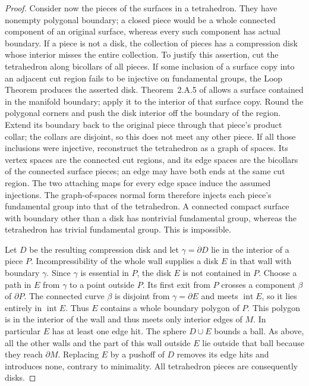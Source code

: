 \documentclass[11pt]{article}
\numberwithin{equation}{section}
\theoremstyle{definition}
\theoremstyle{remark}
\begin{document}
\begin{proof}
Consider now the pieces of the surfaces in a tetrahedron.  They have nonempty
polygonal boundary; a closed piece would be a whole connected component of
an original surface, whereas every such component has actual boundary.
If a piece is not a disk, the collection of pieces has a compression disk
whose interior misses the entire collection.  To justify this assertion, cut
the tetrahedron along bicollars of all pieces.  If some inclusion of a surface
copy into an adjacent cut region fails to be injective on fundamental groups,
the Loop Theorem produces the asserted disk.  Theorem~2.A.5 of \cite[p.~13]{Stallings1971} allows a surface
contained in the manifold boundary; apply it to the interior of that
surface copy.  Round the polygonal corners and push the
disk interior off the boundary of the region.  Extend its boundary back
to the original piece through that piece's product collar; the collars
are disjoint, so this does not meet any other piece.
If all those inclusions were
injective, reconstruct the tetrahedron as a graph of spaces.  Its vertex
spaces are the connected cut regions, and its edge spaces are the
bicollars of the connected surface pieces; an edge may have both ends
at the same cut region.  The two attaching maps for every edge space
induce the assumed injections.  The graph-of-spaces normal form
therefore injects each piece's fundamental group into that of the
tetrahedron.  A connected compact surface
with boundary other than a disk has nontrivial fundamental group, whereas the
tetrahedron has trivial fundamental group.  This is impossible.

Let $D$ be the resulting compression disk and let $\gamma=\partial D$ lie in
the interior of a piece $P$.  Incompressibility of the whole wall supplies a
disk $E$ in that wall with boundary $\gamma$.  Since $\gamma$ is essential in
$P$, the disk $E$ is not contained in $P$.  Choose a path in $E$ from
$\gamma$ to a point outside $P$.  Its first exit from $P$ crosses a
component $\beta$ of $\partial P$.  The connected curve $\beta$ is
disjoint from $\gamma=\partial E$ and meets $\operatorname{int} E$, so it lies
entirely in $\operatorname{int} E$.  Thus $E$ contains a whole boundary polygon
of $P$.
This polygon is in the interior of the wall and thus meets only interior
edges of $M$.  In particular $E$ has at least one edge hit.  The sphere
$D\cup E$ bounds a ball.  As above, all the other walls and the part of this
wall outside $E$ lie outside that ball because they reach $\partial M$.
Replacing $E$ by a pushoff of $D$ removes its edge hits and introduces none,
contrary to minimality.  All tetrahedron pieces are consequently disks.


\end{proof}
\end{document}

